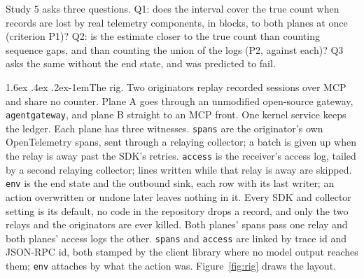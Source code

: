 \documentclass[11pt]{article}
\makeatletter
\renewcommand\paragraph{\@startsection{paragraph}{4}{\z@}%
  {1.6ex \@plus .4ex \@minus .2ex}{-1em}{\normalfont\normalsize\bfseries}}
\makeatother
\begin{document}
Study 5 asks three questions. Q1: does the interval
cover the true count when records are lost by real telemetry components, in blocks, to
both planes at once (criterion P1)? Q2: is the estimate closer to the true count than
counting sequence gaps, and than counting the union of the logs (P2, against each)? Q3
asks the same without the end state, and was predicted to fail.

\paragraph{The rig.} Two originators replay recorded sessions over MCP and share no
counter. Plane A goes through an unmodified open-source gateway, \texttt{agentgateway},
and plane B straight to an MCP front. One kernel service keeps the ledger. Each plane
has three witnesses. \texttt{spans} are the originator's own OpenTelemetry spans, sent
through a relaying collector; a batch is given up when the relay is away past the SDK's
retries. \texttt{access} is the receiver's access log, tailed by a second relaying
collector; lines written while that relay is away are skipped. \texttt{env} is the end
state and the outbound sink, each row with its last writer; an action overwritten or
undone later leaves nothing in it. Every SDK and collector setting is its default, no
code in the repository drops a record, and only the two relays and the originators are
ever killed. Both planes' spans pass one relay and both planes' access logs the other.
\texttt{spans} and \texttt{access} are linked by trace id and JSON-RPC id, both stamped
by the client library where no model output reaches them; \texttt{env} attaches by what
the action was. Figure~\ref{fig:rig} draws the layout.
\end{document}
